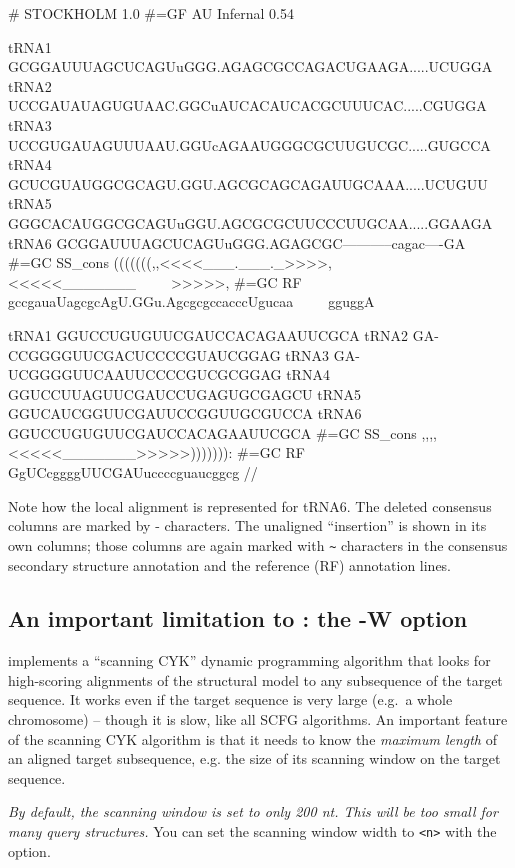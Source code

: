 {\samepage
\begin{sreoutput}
# STOCKHOLM 1.0
#=GF AU    Infernal 0.54

tRNA1             GCGGAUUUAGCUCAGUuGGG.AGAGCGCCAGACUGAAGA.....UCUGGA
tRNA2             UCCGAUAUAGUGUAAC.GGCuAUCACAUCACGCUUUCAC.....CGUGGA
tRNA3             UCCGUGAUAGUUUAAU.GGUcAGAAUGGGCGCUUGUCGC.....GUGCCA
tRNA4             GCUCGUAUGGCGCAGU.GGU.AGCGCAGCAGAUUGCAAA.....UCUGUU
tRNA5             GGGCACAUGGCGCAGUuGGU.AGCGCGCUUCCCUUGCAA.....GGAAGA
tRNA6             GCGGAUUUAGCUCAGUuGGG.AGAGCGC-----------cagac----GA
#=GC SS_cons      (((((((,,<<<<___.___._>>>>,<<<<<_______~~~~~>>>>>,
#=GC RF           gccgauaUagcgcAgU.GGu.AgcgcgccacccUgucaa~~~~~gguggA

tRNA1             GGUCCUGUGUUCGAUCCACAGAAUUCGCA
tRNA2             GA-CCGGGGUUCGACUCCCCGUAUCGGAG
tRNA3             GA-UCGGGGUUCAAUUCCCCGUCGCGGAG
tRNA4             GGUCCUUAGUUCGAUCCUGAGUGCGAGCU
tRNA5             GGUCAUCGGUUCGAUUCCGGUUGCGUCCA
tRNA6             GGUCCUGUGUUCGAUCCACAGAAUUCGCA
#=GC SS_cons      ,,,,<<<<<_______>>>>>))))))):
#=GC RF           GgUCcggggUUCGAUuccccguaucggcg
//
\end{sreoutput}
}

Note how the local alignment is represented for tRNA6. The deleted
consensus columns are marked by - characters. The unaligned
``insertion'' is shown in its own columns; those columns are again
marked with \verb+~+ characters in the consensus secondary structure
annotation and the reference (RF) annotation lines.

\subsection{An important limitation to : the -W option}

 implements a ``scanning CYK'' dynamic programming
algorithm \cite{Durbin98} that looks for high-scoring alignments of
the structural model to any subsequence of the target sequence. It
works even if the target sequence is very large (e.g.\ a whole
chromosome) -- though it is slow, like all SCFG algorithms. An
important feature of the scanning CYK algorithm is that it needs to
know the \emph{maximum length} of an aligned target subsequence, e.g.
the size of its scanning window on the target sequence.

\emph{By default, the scanning window is set to only 200 nt. This will
be too small for many query structures.} You can set the scanning
window width to \verb+<n>+ with the  option. 

